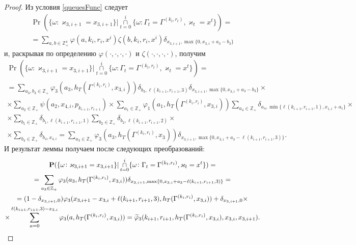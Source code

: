 \documentclass{report}
\begin{document}
\begin{proof}
Из условия \eqref{queuesFunc} следует
\begin{multline*}
\Pr (\{ \omega \colon \varkappa_{3,i+1} = x_{3,i+1}\} |\mathop{\cap}\limits_{t=0}^{i}\{\omega\colon \Gamma_t=\Gamma^{(k_t,r_t)}, \varkappa_t=x^t\})=\\
= \sum_{a,b\in \mathbb{Z}_+^4} \varphi(a,k_i,r_i,x^i)\zeta(b,k_i,r_i,x^i)  \delta_{x_{3,i+1},\max\{0,x_{3,i}+a_3-b_3\}} 
\end{multline*}
и, раскрывая по определению $\varphi(\cdot, \cdot, \cdot, \cdot)$ и $\zeta(\cdot, \cdot, \cdot, \cdot)$, получим
\begin{multline*}
\Pr (\{ \omega \colon \varkappa_{3,i+1} = x_{3,i+1}\} |\mathop{\cap}\limits_{t=0}^{i}\{\omega\colon \Gamma_t=\Gamma^{(k_t,r_t)}, \varkappa_t=x^t\})=\\= \sum_{a_3,b_3\in \mathbb{Z}_+} \varphi_3(a_3,h_T(\Gamma^{(k_i,r_i)},x_{3,i})) \delta_{b_3,\ell(k_{i+1},r_{i+1},3)} \delta_{x_{3,i+1},\max\{0,x_{3,i}+a_3-b_3\}} \times \\
\times
\sum_{a_2\in \mathbb{Z}_+} \psi(a_2,x_{4,i}, p_{k_{i+1},r_{i+1}}) 
\times \sum_{a_1\in \mathbb{Z}_+}  \varphi_1(a_1,h_T(\Gamma^{(k_i,r_i)},x_{3,i})) \sum_{a_4\in \mathbb{Z}_+} \delta_{a_4,\min{\{\ell(k_{i+1},r_{i+1},1), x_{1,i}+a_1}\}} \times \\ \times  \sum_{b_1\in \mathbb{Z}_+}  \delta_{b_1,\ell(k_{i+1},r_{i+1},1)} 
\sum_{b_2\in \mathbb{Z}_+}  \delta_{b_2,\ell(k_{i+1},r_{i+1},2)} \times \\
\times  \sum_{b_4\in \mathbb{Z}_+}\delta_{b_4,x_{4,i}} =  \sum_{a_3\in \mathbb{Z}_+} \varphi_3(a_3,h_T(\Gamma^{(k_i,r_i)},x_3))  \delta_{x_{3,i+1},\max\{0,x_{3,i}+a_3-\ell(k_{i+1},r_{i+1},3)\}}.
\end{multline*}
И результат леммы получаем после следующих преобразований:
\begin{multline*}
\Pr (\{ \omega \colon \varkappa_{3,i+1} = x_{3,i+1}\} |\mathop{\cap}\limits_{t=0}^{i}\{\omega\colon \Gamma_t=\Gamma^{(k_t,r_t)}, \varkappa_t=x^t\})=\\
=\sum_{a_3\in \mathbb{Z}_+} \varphi_3(a_3,h_T(\Gamma^{(k_i,r_i)},x_{3,i}))  \delta_{x_{3,i+1},\max\{0,x_{3,i}+a_3-\ell(k_{i+1},r_{i+1},3)\}}  = \\
=(1 - \delta_{x_{3,i+1},0})\varphi_3(x_{3,i+1}-x_{3,i} + \ell(k_{i+1},r_{i+1},3),h_T(\Gamma^{(k_i,r_i)},x_{3,i})) 
+\delta_{x_{3,i+1},0}\times\\\times\sum_{a=0}^{\ell(k_{i+1},r_{i+1},3)-x_{3,i}} \varphi_3(a,h_T(\Gamma^{(k_i,r_i)},x_{3,i})) 
=\widetilde{\varphi}_3(k_{i+1},r_{i+1},h_T(\Gamma^{(k_i,r_i)},x_{3,i}),x_{3,i},x_{3,i+1}).\qedhere
\end{multline*}
\end{proof}
\end{document}
